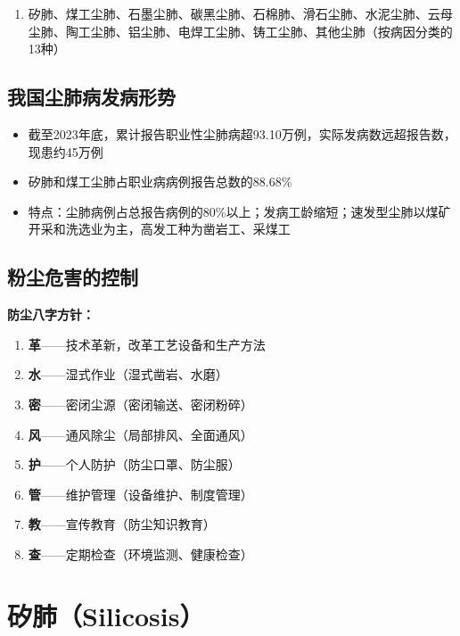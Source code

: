 \begin{enumerate}[leftmargin=*]
    \item 矽肺、煤工尘肺、石墨尘肺、碳黑尘肺、石棉肺、滑石尘肺、水泥尘肺、云母尘肺、陶工尘肺、铝尘肺、电焊工尘肺、铸工尘肺、其他尘肺（按病因分类的13种）
\end{enumerate}

\subsection{我国尘肺病发病形势}

\begin{itemize}[leftmargin=*]
    \item 截至2023年底，累计报告职业性尘肺病超93.10万例，实际发病数远超报告数，现患约45万例
    \item 矽肺和煤工尘肺占职业病病例报告总数的88.68\%
    \item 特点：尘肺病例占总报告病例的80\%以上；发病工龄缩短；速发型尘肺以煤矿开采和洗选业为主，高发工种为凿岩工、采煤工
\end{itemize}

\subsection{粉尘危害的控制}

\begin{keybox}
\textbf{防尘八字方针：}

\begin{enumerate}[leftmargin=*]
    \item \textbf{革}——技术革新，改革工艺设备和生产方法
    \item \textbf{水}——湿式作业（湿式凿岩、水磨）
    \item \textbf{密}——密闭尘源（密闭输送、密闭粉碎）
    \item \textbf{风}——通风除尘（局部排风、全面通风）
    \item \textbf{护}——个人防护（防尘口罩、防尘服）
    \item \textbf{管}——维护管理（设备维护、制度管理）
    \item \textbf{教}——宣传教育（防尘知识教育）
    \item \textbf{查}——定期检查（环境监测、健康检查）
\end{enumerate}
\end{keybox}

\section{矽肺（Silicosis）}

